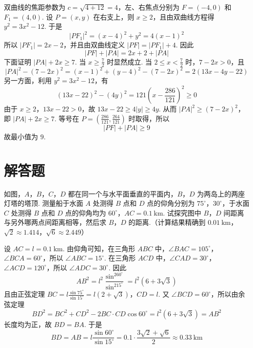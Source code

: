\begin{solution}
双曲线的焦距参数为 \(c=\sqrt{4+12}=4\)，左、右焦点分别为 \(F=(-4,0)\) 和 \(F_1=(4,0)\). 设 \(P=(x,y)\) 在右支上，则 \(x\geqslant2\)，且由双曲线方程得 \(y^2=3x^2-12\). 于是
\[
|PF_1|^2=(x-4)^2+y^2=4(x-1)^2
\]
所以 \(|PF_1|=2x-2\)，并且由双曲线定义 \(|PF|=|PF_1|+4\). 因此
\[
|PF|+|PA|=2x+2+|PA|
\]
下面证明 \(|PA|+2x\geqslant7\). 当 \(x\geqslant\frac72\) 时显然成立. 当 \(2\leqslant x<\frac72\) 时，\(7-2x>0\)，且
\[
|PA|^2-(7-2x)^2=(x-1)^2+(y-4)^2-(7-2x)^2=2(13x-4y-22)
\]
另一方面，利用 \(y^2=3x^2-12\)，有
\[
(13x-22)^2-(4y)^2=121\left(x-\frac{286}{121}\right)^2\geqslant0
\]
由于 \(x\geqslant2\)，\(13x-22>0\)，故 \(13x-22\geqslant4|y|\geqslant4y\). 从而 \(|PA|^2\geqslant(7-2x)^2\)，即 \(|PA|+2x\geqslant7\). 等号在 \(P=\left(\frac{286}{121},\frac{264}{121}\right)\) 时取得，所以
\[
|PF|+|PA|\geqslant9
\]
故最小值为 \(9\).
\end{solution}

\section{解答题}

\begin{problem}
如图，\(A\)，\(B\)，\(C\)，\(D\) 都在同一个与水平面垂直的平面内，\(B\)，\(D\) 为两岛上的两座灯塔的塔顶. 测量船于水面 \(A\) 处测得 \(B\) 点和 \(D\) 点的仰角分别为 \(75^{\circ}\)，\(30^{\circ}\)，于水面 \(C\) 处测得 \(B\) 点和 \(D\) 点的仰角均为 \(60^{\circ}\)，\(AC = 0.1 \mathrm{~km}\). 试探究图中 \(B\)，\(D\) 间距离与另外哪两点间距离相等，然后求 \(B\)，\(D\) 的距离.（计算结果精确到 \(0.01 \mathrm{~km}\)，\(\sqrt{2} \approx 1.414\)，\(\sqrt{6} \approx 2.449\)）

\end{problem}

\begin{solution}
设 \(AC=l=0.1\mathrm{~km}\). 由仰角可知，在三角形 \(ABC\) 中，\(\angle BAC=105^{\circ}\)，\(\angle BCA=60^{\circ}\)，所以 \(\angle ABC=15^{\circ}\). 在三角形 \(ACD\) 中，\(\angle CAD=30^{\circ}\)，\(\angle ACD=120^{\circ}\)，所以 \(\angle ADC=30^{\circ}\). 因此
\[
AB^2=l^2\frac{\sin^260^{\circ}}{\sin^215^{\circ}}=l^2(6+3\sqrt3)
\]
且由正弦定理 \(BC=l\frac{\sin75^{\circ}}{\sin15^{\circ}}=l(2+\sqrt3)\)，\(CD=l\). 又 \(\angle BCD=60^{\circ}\)，所以由余弦定理
\[
BD^2=BC^2+CD^2-2BC\cdot CD\cos60^{\circ}=l^2(6+3\sqrt3)=AB^2
\]
长度均为正，故 \(BD=BA\). 于是
\[
BD=AB=l\frac{\sin60^{\circ}}{\sin15^{\circ}}=0.1\cdot\frac{3\sqrt2+\sqrt6}{2}\approx0.33\mathrm{~km}
\]
\end{solution}

